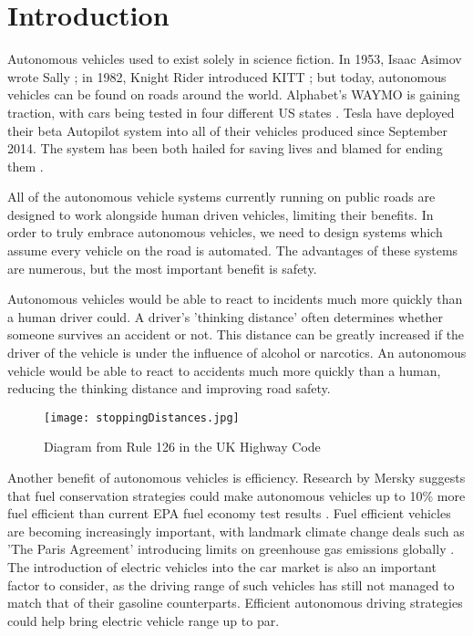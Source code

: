 \chapter{Introduction}
\label{cha:Introduction}

Autonomous vehicles used to exist solely in science fiction. In 1953, Isaac Asimov wrote Sally \citep{Asimov1953}; in 1982, Knight Rider introduced KITT \citep{Kitt1982}; but today, autonomous vehicles can be found on roads around the world. Alphabet's WAYMO is gaining traction, with cars being tested in four different US states \citep{Waymo2016}. Tesla have deployed their beta Autopilot system into all of their vehicles produced since September 2014. The system has been both hailed for saving lives and blamed for ending them \citep{TeslaHospital} \citep{TeslaUnderInvestigation}.

All of the autonomous vehicle systems currently running on public roads are designed to work alongside human driven vehicles, limiting their benefits. In order to truly embrace autonomous vehicles, we need to design systems which assume every vehicle on the road is automated. The advantages of these systems are numerous, but the most important benefit is safety.

Autonomous vehicles would be able to react to incidents much more quickly than a human driver could. A driver's 'thinking distance' often determines whether someone survives an accident or not. This distance can be greatly increased if the driver of the vehicle is under the influence of alcohol or narcotics. An autonomous vehicle would be able to react to accidents much more quickly than a human, reducing the thinking distance and improving road safety.

\begin{figure}[htb]
\texttt{[image: stoppingDistances.jpg]}
\caption{Diagram from Rule 126 in the UK Highway Code \citep{StoppingDistances}}
\label{fig:StoppingDistances}
\end{figure}

Another benefit of autonomous vehicles is efficiency. Research by Mersky suggests that fuel conservation strategies could make autonomous vehicles up to 10\% more fuel efficient than current EPA fuel economy test results \citep{Mersky2016}. Fuel efficient vehicles are becoming increasingly important, with landmark climate change deals such as 'The Paris Agreement' introducing limits on greenhouse gas emissions globally \citep{Paris2016}. The introduction of electric vehicles into the car market is also an important factor to consider, as the driving range of such vehicles has still not managed to match that of their gasoline counterparts. Efficient autonomous driving strategies could help bring electric vehicle range up to par.

